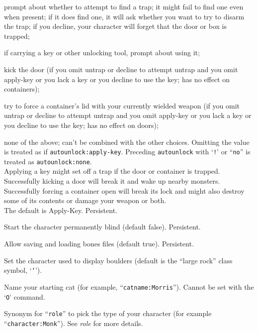 \settowidth{\auwidth}{\tt Apply-Key}
\addtolength{\auwidth}{\labelsep}
\blist{\leftmargin \auwidth \topsep 1mm \itemsep 0mm}
\item[{\tt Untrap}]
prompt about whether to attempt to find a trap;
it might fail to find one even when present; if it does find one, it
will ask whether you want to try to disarm the trap; if you decline,
your character will forget that the door or box is trapped;
\item[{\tt Apply-Key}]
if carrying a key or other unlocking tool, prompt about using it;
\item[{\tt Kick}]
kick the door (if you omit untrap or decline to attempt untrap and
you omit apply-key or you lack a key or you decline to use the key;
has no effect on containers);
\item[{\tt Force}]
try to force a container's lid with your currently
wielded weapon (if you omit untrap or decline to attempt untrap and
you omit apply-key or you lack a key or you decline to use the key;
has no effect on doors);
\item[{\tt None}]
none of the above; can't be combined with the other choices.
\elist
Omitting the value is treated as if {\tt autounlock:apply-key}.
Preceding {\tt autounlock} with `{\tt !}' or ``{\tt no}'' is treated as
{\tt autounlock:none}.
\\
Applying a key might set off a trap if the door or container is trapped.
Successfully kicking a door will break it and wake up nearby monsters.
Successfully forcing a container open will break its lock and might also
destroy some of its contents or damage your weapon or both.
\\
The default is Apply-Key.
Persistent.
\item[\ib{blind}]
Start the character permanently blind (default false).  Persistent.
\item[\ib{bones}]
Allow saving and loading bones files (default true).  Persistent.
\item[\ib{boulder}]
Set the character used to display boulders (default is the ``large rock''
class symbol, `{\tt `}').
\item[\ib{catname}]
Name your starting cat (for example, ``{\tt catname:Morris}'').
Cannot be set with the `{\tt O}' command.
\item[\ib{character}]
Synonym for ``{\tt role}'' to pick the type of your character
(for example ``{\tt character:Monk}'').  See {\it role\/} for more details.
